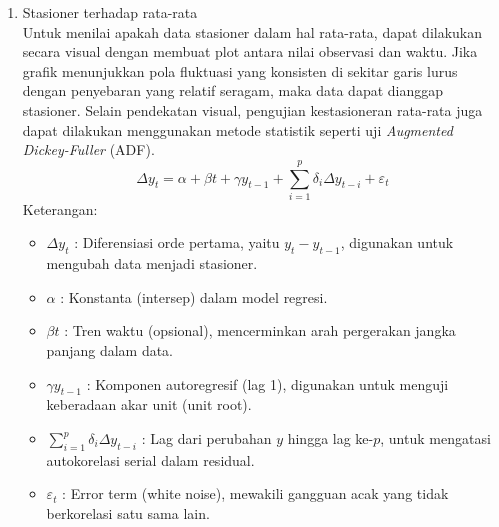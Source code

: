\begin{enumerate}[label=\alph*.]
        Nilai $\lambda$ dan bentuk transformasi Boxcox yang sesuai disajikan dalam tabel berikut:
        
    \item Stasioner terhadap rata-rata \\
        Untuk menilai apakah data stasioner dalam hal rata-rata, dapat dilakukan secara visual dengan membuat plot antara nilai observasi dan waktu. 
        Jika grafik menunjukkan pola fluktuasi yang konsisten di sekitar garis lurus dengan penyebaran yang relatif seragam, maka data dapat dianggap stasioner. 
        Selain pendekatan visual, pengujian kestasioneran rata-rata juga dapat dilakukan menggunakan metode statistik seperti uji \textit{Augmented Dickey-Fuller} (ADF).
        \begin{equation}\label{adf}
            \Delta y_t = \alpha + \beta t + \gamma y_{t-1} + \sum_{i=1}^{p} \delta_i \Delta y_{t-i} + \varepsilon_t
        \end{equation}
        Keterangan:
        \begin{itemize}
            \item $\Delta y_t$ : Diferensiasi orde pertama, yaitu $y_t - y_{t-1}$, digunakan untuk mengubah data menjadi stasioner.
            \item $\alpha$ : Konstanta (intersep) dalam model regresi.
            \item $\beta t$ : Tren waktu (opsional), mencerminkan arah pergerakan jangka panjang dalam data.
            \item $\gamma y_{t-1}$ : Komponen autoregresif (lag 1), digunakan untuk menguji keberadaan akar unit (unit root).
            \item $\sum_{i=1}^{p} \delta_i \Delta y_{t-i}$ : Lag dari perubahan $y$ hingga lag ke-$p$, untuk mengatasi autokorelasi serial dalam residual.
            \item $\varepsilon_t$ : Error term (white noise), mewakili gangguan acak yang tidak berkorelasi satu sama lain.
        \end{itemize}
\end{enumerate}